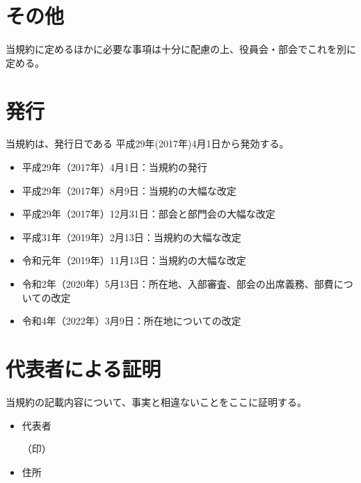 \documentclass[12pt, unicode, a4paper]{ltjsreport}
\begin{document}
    \section*{その他}
        当規約に定めるほかに必要な事項は十分に配慮の上、役員会・部会でこれを別に定める。

    \section*{発行}
        当規約は、発行日である 平成29年(2017年)4月1日から発効する。
        \begin{itemize}
            \item 平成29年（2017年）4月1日：当規約の発行
            \item 平成29年（2017年）8月9日：当規約の大幅な改定
            \item 平成29年（2017年）12月31日：部会と部門会の大幅な改定
            \item 平成31年（2019年）2月13日：当規約の大幅な改定
            \item 令和元年（2019年）11月13日：当規約の大幅な改定
            \item 令和2年（2020年）5月13日：所在地、入部審査、部会の出席義務、部費についての改定
            \item 令和4年（2022年）3月9日：所在地についての改定
        \end{itemize}

    \section*{代表者による証明}
        当規約の記載内容について、事実と相違ないことをここに証明する。
        \begin{itemize}
            \item 代表者
            \begin{flushright}
                （印）
            \end{flushright}
            \item 住所
        \end{itemize}
\end{document}
